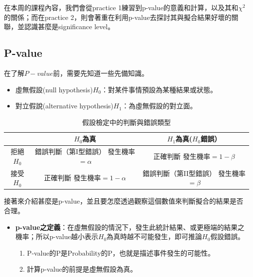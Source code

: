 \documentclass[12pt,a4paper]{article}
\begin{document}
\begin{CJK}{UTF8}{bkai}
在本周的課程內容，我們會從practice 1練習到p-value的意義和計算，以及其和$\chi^2$的關係；而在practice 2，則會著重在利用p-value去探討其與擬合結果好壞的關聯，並認識甚麼是significance level。

\subsection{P-value}
\hfill

在了解$P-value$前，需要先知道一些先備知識。
\begin{itemize}
    \item 虛無假設(null hypothesis)$H_0$：對某件事情預設為某種結果或狀態。
    \item 對立假說(alternative hypothesis)$H_1$：為虛無假設的對立面。
\end{itemize}

\begin{table}[h]
    \centering
    \begin{tabular}{|c|c|c|}
        \hline
        &$H_0$為真&$H_1$為真($H_0$錯誤）\\
        \hline
        拒絕$H_0$&\makecell{錯誤判斷（第I型錯誤）\\發生機率$=\alpha$}&\makecell{正確判斷\\發生機率$= 1-\beta$} \\
        \hline
        接受$H_0$&\makecell{正確判斷\\發生機率$=1-\alpha$}&\makecell{錯誤判斷（第II型錯誤）\\發生機率$=\beta$}\\
        \hline
    \end{tabular}
    \caption{假設檢定中的判斷與錯誤類型}
    \label{tab:1}
\end{table}


接著來介紹甚麼是p-value，並且要怎麼透過觀察這個數值來判斷擬合的結果是否合理。

\begin{itemize}
    \item \textbf{p-value之定義}：在虛無假設的情況下，發生此統計結果、或更極端的結果之機率；所以p-value越小表示$H_0$為真時越不可能發生，即可推論$H_0$假設錯誤。
    \begin{enumerate}
        \item P-value的P是Probability的P，也就是描述事件發生的可能性。
        \item 計算p-value的前提是虛無假設為真。
    \end{enumerate}
\end{itemize}


\end{CJK}
\end{document}
